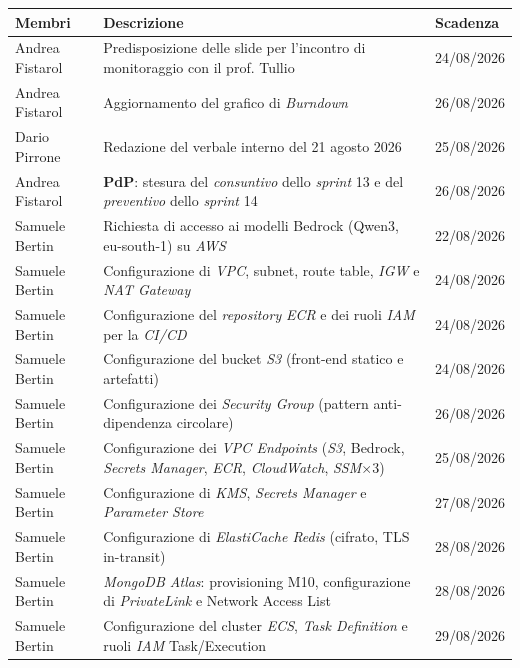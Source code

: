 \documentclass[12pt, a4paper]{article}
\begin{document}
\renewcommand{\arraystretch}{1.3}
\begin{xltabular}{\textwidth}{|l|X|l|}
    
    \hline
    \textbf{Membri} & \textbf{Descrizione} & \textbf{Scadenza} \\ \hline
    \endfirsthead
    

    Andrea Fistarol & Predisposizione delle slide per l'incontro di monitoraggio con il prof. Tullio & 24/08/2026 \\ \hline
    Andrea Fistarol & Aggiornamento del grafico di \textit{Burndown} & 26/08/2026 \\ \hline
    Dario Pirrone & Redazione del verbale interno del 21 agosto 2026 & 25/08/2026 \\ \hline
    Andrea Fistarol & \textbf{PdP}: stesura del \textit{consuntivo} dello \textit{sprint} 13 e del \textit{preventivo} dello \textit{sprint} 14 & 26/08/2026 \\ \hline
    Samuele Bertin & Richiesta di accesso ai modelli Bedrock (Qwen3, eu-south-1) su \textit{AWS} & 22/08/2026 \\ \hline
    Samuele Bertin & Configurazione di \textit{VPC}, subnet, route table, \textit{IGW} e \textit{NAT Gateway} & 24/08/2026 \\ \hline
    Samuele Bertin & Configurazione del \textit{repository} \textit{ECR} e dei ruoli \textit{IAM} per la \textit{CI/CD} & 24/08/2026 \\ \hline
    Samuele Bertin & Configurazione del bucket \textit{S3} (front-end statico e artefatti) & 24/08/2026 \\ \hline
    Samuele Bertin & Configurazione dei \textit{Security Group} (pattern anti-dipendenza circolare) & 26/08/2026 \\ \hline
    Samuele Bertin & Configurazione dei \textit{VPC Endpoints} (\textit{S3}, Bedrock, \textit{Secrets Manager}, \textit{ECR}, \textit{CloudWatch}, \textit{SSM}$\times$3) & 25/08/2026 \\ \hline
    Samuele Bertin & Configurazione di \textit{KMS}, \textit{Secrets Manager} e \textit{Parameter Store} & 27/08/2026 \\ \hline
    Samuele Bertin & Configurazione di \textit{ElastiCache Redis} (cifrato, TLS in-transit) & 28/08/2026 \\ \hline
    Samuele Bertin & \textit{MongoDB Atlas}: provisioning M10, configurazione di \textit{PrivateLink} e Network Access List & 28/08/2026 \\ \hline
    Samuele Bertin & Configurazione del cluster \textit{ECS}, \textit{Task Definition} e ruoli \textit{IAM} Task/Execution & 29/08/2026 \\ \hline

\end{xltabular}
\end{document}
